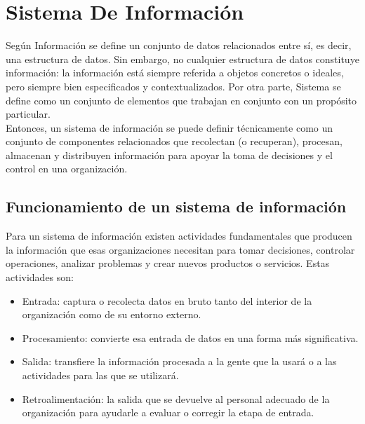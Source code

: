 \section{Sistema De Información}

Según \cite{ITSOM_SI} Información se define un conjunto de datos relacionados entre sí, es decir, una estructura de datos. Sin embargo, no cualquier estructura de datos constituye información: la información está siempre referida a objetos concretos o ideales, pero siempre bien especificados y contextualizados. Por otra parte, Sistema \cite{CAM_SYSTEM} se define como un conjunto de elementos que trabajan en conjunto con un propósito particular.\\

Entonces, un sistema de información se puede definir técnicamente como un conjunto de componentes relacionados que recolectan (o recuperan), procesan, almacenan y distribuyen información para apoyar la toma de decisiones y el control en una organización. \cite{ITSOM_SI}

\subsection{Funcionamiento de un sistema de información}
Para un sistema de información existen actividades fundamentales que producen la información que esas organizaciones necesitan para tomar decisiones, controlar operaciones, analizar problemas y crear nuevos productos o servicios. Estas actividades son:
\begin{itemize}
  \item  Entrada: captura o recolecta datos en bruto tanto del interior de la organización como de su entorno externo.
  \item Procesamiento: convierte esa entrada de datos en una forma más significativa.
  \item  Salida: transfiere la información procesada a la gente que la usará o a las actividades para las que se utilizará.
  \item Retroalimentación: la salida que se devuelve al personal adecuado de la organización para ayudarle a evaluar o corregir la etapa de entrada.
\end{itemize} %

